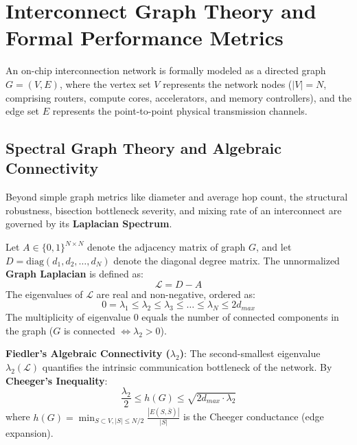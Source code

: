 \section{Interconnect Graph Theory and Formal Performance Metrics}
\label{sec:ch4_metrics}

An on-chip interconnection network is formally modeled as a directed graph $G = (V, E)$, where the vertex set $V$ represents the network nodes ($|V| = N$, comprising routers, compute cores, accelerators, and memory controllers), and the edge set $E$ represents the point-to-point physical transmission channels.

\subsection{Spectral Graph Theory and Algebraic Connectivity}
\label{subsec:ch4_spectral}

Beyond simple graph metrics like diameter and average hop count, the structural robustness, bisection bottleneck severity, and mixing rate of an interconnect are governed by its \textbf{Laplacian Spectrum}.

Let $A \in \{0, 1\}^{N \times N}$ denote the adjacency matrix of graph $G$, and let $D = \text{diag}(d_1, d_2, \dots, d_N)$ denote the diagonal degree matrix. The unnormalized \textbf{Graph Laplacian} is defined as:
\begin{equation}
\mathcal{L} = D - A
\label{eq:ch4_laplacian}
\end{equation}
The eigenvalues of $\mathcal{L}$ are real and non-negative, ordered as:
\begin{equation}
0 = \lambda_1 \le \lambda_2 \le \lambda_3 \le \dots \le \lambda_N \le 2 d_{max}
\end{equation}
The multiplicity of eigenvalue 0 equals the number of connected components in the graph ($G$ is connected $\iff \lambda_2 > 0$).

\begin{svgraybox}
\textbf{Fiedler's Algebraic Connectivity ($\lambda_2$)}: The second-smallest eigenvalue $\lambda_2(\mathcal{L})$ quantifies the intrinsic communication bottleneck of the network. By \textbf{Cheeger's Inequality}:
\begin{equation}
\frac{\lambda_2}{2} \le h(G) \le \sqrt{2 d_{max} \cdot \lambda_2}
\label{eq:ch4_cheeger}
\end{equation}
where $h(G) = \min_{S \subset V, |S| \le N/2} \frac{|E(S, \bar{S})|}{|S|}$ is the Cheeger conductance (edge expansion).
\end{svgraybox}

